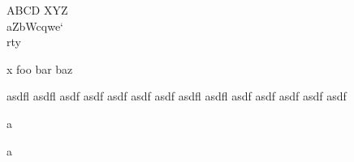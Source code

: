 \documentclass{article}
\begin{document}
\def\aaa{}
\def\yyy{Y}
\def\zzz{Z}
\def\www{W}
\def\xxx#1a#2b#3c{#1 #2 #3}
ABCD
\xxx XYZ\\a\zzz b\www cqwe\char`\\rty\par
x
foo bar baz
\par
asdfl asdfl asdf asdf asdf asdf asdf
asdfl asdfl asdf asdf asdf asdf asdf%

a

a

\end{document}
